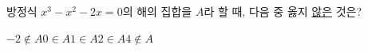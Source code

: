 방정식 $x^3-x^2-2x=0$의 해의 집합을 $A$라 할 때, 다음 중 옳지 \underline{않은} 것은?
\begin{choices32}{$-2\notin A$}{$0\in A$}{$1\in A$}{$2\in A$}{$4\notin A$}\end{choices32}
